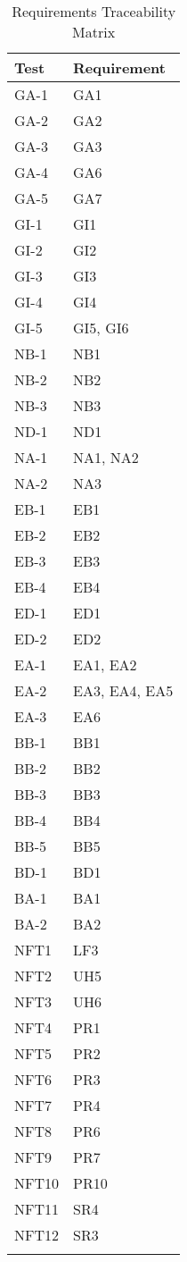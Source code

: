\documentclass[12pt, titlepage]{article}
\begin{document}
\begin{longtable}{| p{} | p{} |}
  \hline
  Test & Requirement\\
  \hline
  GA-1 & GA1\\
  \hline
  GA-2 & GA2\\
  \hline
  GA-3 & GA3\\
  \hline
  GA-4 & GA6\\
  \hline
  GA-5 & GA7\\
  \hline
  GI-1 & GI1\\
  \hline
  GI-2 & GI2\\
  \hline
  GI-3 & GI3\\
  \hline
  GI-4 & GI4\\
  \hline
  GI-5 & GI5, GI6\\
  \hline
  NB-1 & NB1\\
  \hline
  NB-2 & NB2\\
  \hline
  NB-3 & NB3\\
  \hline
  ND-1 & ND1\\
  \hline
  NA-1 & NA1, NA2\\
  \hline
  NA-2 & NA3\\
  \hline
  EB-1 & EB1\\
  \hline
  EB-2 & EB2\\
  \hline
  EB-3 & EB3\\
  \hline
  EB-4 & EB4\\
  \hline
  ED-1 & ED1\\
  \hline
  ED-2 & ED2\\
  \hline
  EA-1 & EA1, EA2\\
  \hline
  EA-2 & EA3, EA4, EA5\\
  \hline
  EA-3 & EA6\\
  \hline
  BB-1 & BB1\\
  \hline
  BB-2 & BB2\\
  \hline
  BB-3 & BB3\\
  \hline
  BB-4 & BB4\\
  \hline
  BB-5 & BB5\\
  \hline
  BD-1 & BD1\\
  \hline
  BA-1 & BA1\\
  \hline
  BA-2 & BA2\\
  \hline
  NFT1 & LF3\\
  \hline
  NFT2 & UH5\\
  \hline
  NFT3 & UH6\\
  \hline
  NFT4 & PR1\\
  \hline
  NFT5 & PR2\\
  \hline
  NFT6 & PR3\\
  \hline
  NFT7 & PR4\\
  \hline
  NFT8 & PR6\\
  \hline
  NFT9 & PR7\\
  \hline
  NFT10 & PR10\\
  \hline
  NFT11 & SR4\\
  \hline
  NFT12 & SR3\\
  \hline
\caption{Requirements Traceability Matrix}
\end{longtable}
		
\end{document}
